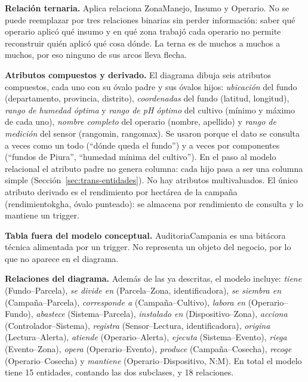 \documentclass[11pt,letterpaper]{article}
\newcommand{\tbus}{\textunderscore\allowbreak}
\newcommand{\tb}[1]{{\ttfamily\let\_\tbus #1}}
\begin{document}
\textbf{Relación ternaria.} \tb{Aplica} relaciona \tb{Zona\_Manejo}, \tb{Insumo} y \tb{Operario}. No se puede reemplazar por tres relaciones binarias sin perder información: saber qué operario aplicó qué insumo y en qué zona trabajó cada operario no permite reconstruir quién aplicó qué cosa dónde. La terna es de muchos a muchos a muchos, por eso ninguno de sus arcos lleva flecha.

\textbf{Atributos compuestos y derivado.} El diagrama dibuja seis atributos compuestos, cada uno con su óvalo padre y sus óvalos hijos: \emph{ubicación} del fundo (\tb{departamento}, \tb{provincia}, \tb{distrito}), \emph{coordenadas} del fundo (\tb{latitud}, \tb{longitud}), \emph{rango de humedad óptima} y \emph{rango de pH óptimo} del cultivo (mínimo y máximo de cada uno), \emph{nombre completo} del operario (\tb{nombre}, \tb{apellido}) y \emph{rango de medición} del sensor (\tb{rango\_min}, \tb{rango\_max}). Se usaron porque el dato se consulta a veces como un todo (``dónde queda el fundo'') y a veces por componentes (``fundos de Piura'', ``humedad mínima del cultivo''). En el paso al modelo relacional el atributo padre no genera columna: cada hijo pasa a ser una columna simple (Sección~\ref{sec:trans-entidades}). No hay atributos multivaluados. El único atributo derivado es el rendimiento por hectárea de la campaña (\tb{rendimiento\_kg\_ha}, óvalo punteado): se almacena por rendimiento de consulta y lo mantiene un trigger.

\textbf{Tabla fuera del modelo conceptual.} \tb{Auditoria\_Campania} es una bitácora técnica alimentada por un trigger. No representa un objeto del negocio, por lo que no aparece en el diagrama.

\textbf{Relaciones del diagrama.} Además de las ya descritas, el modelo incluye: \emph{tiene} (Fundo--Parcela), \emph{se divide en} (Parcela--Zona, identificadora), \emph{se siembra en} (Campaña--Parcela), \emph{corresponde a} (Campaña--Cultivo), \emph{labora en} (Operario--Fundo), \emph{abastece} (Sistema--Parcela), \emph{instalado en} (Dispositivo--Zona), \emph{acciona} (Controlador--Sistema), \emph{registra} (Sensor--Lectura, identificadora), \emph{origina} (Lectura--Alerta), \emph{atiende} (Operario--Alerta), \emph{ejecuta} (Sistema--Evento), \emph{riega} (Evento--Zona), \emph{opera} (Operario--Evento), \emph{produce} (Campaña--Cosecha), \emph{recoge} (Operario--Cosecha) y \emph{mantiene} (Operario--Dispositivo, N:M). En total el modelo tiene 15 entidades, contando las dos subclases, y 18 relaciones.
\end{document}
